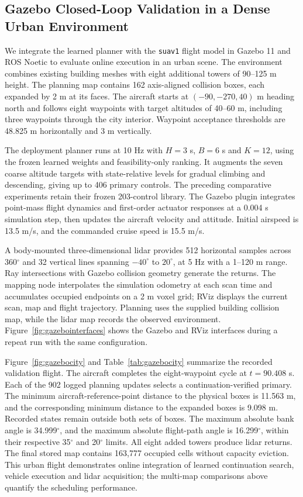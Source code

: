 \subsection{Gazebo Closed-Loop Validation in a Dense Urban Environment}
\label{sec:gazebocity}
We integrate the learned planner with the \texttt{suav1} flight model in Gazebo 11 and ROS Noetic to evaluate online execution in an urban scene. The environment combines existing building meshes with eight additional towers of 90--125 m height. The planning map contains 162 axis-aligned collision boxes, each expanded by 2 m at its faces. The aircraft starts at $(-90,-270,40)$ m heading north and follows eight waypoints with target altitudes of 40--60 m, including three waypoints through the city interior. Waypoint acceptance thresholds are 48.825 m horizontally and 3 m vertically.

The deployment planner runs at 10 Hz with $H=3$ s, $B=6$ s and $K=12$, using the frozen learned weights and feasibility-only ranking. It augments the seven coarse altitude targets with state-relative levels for gradual climbing and descending, giving up to 406 primary controls. The preceding comparative experiments retain their frozen 203-control library. The Gazebo plugin integrates point-mass flight dynamics and first-order actuator responses at a 0.004 s simulation step, then updates the aircraft velocity and attitude. Initial airspeed is 13.5 m/s, and the commanded cruise speed is 15.5 m/s.

A body-mounted three-dimensional lidar provides 512 horizontal samples across 360$^\circ$ and 32 vertical lines spanning $-40^\circ$ to $20^\circ$, at 5 Hz with a 1--120 m range. Ray intersections with Gazebo collision geometry generate the returns. The mapping node interpolates the simulation odometry at each scan time and accumulates occupied endpoints on a 2 m voxel grid; RViz displays the current scan, map and flight trajectory. Planning uses the supplied building collision map, while the lidar map records the observed environment. Figure~\ref{fig:gazebointerfaces} shows the Gazebo and RViz interfaces during a repeat run with the same configuration.

Figure~\ref{fig:gazebocity} and Table~\ref{tab:gazebocity} summarize the recorded validation flight. The aircraft completes the eight-waypoint cycle at $t=90.408$ s. Each of the 902 logged planning updates selects a continuation-verified primary. The minimum aircraft-reference-point distance to the physical boxes is 11.563 m, and the corresponding minimum distance to the expanded boxes is 9.098 m. Recorded states remain outside both sets of boxes. The maximum absolute bank angle is 34.999$^\circ$, and the maximum absolute flight-path angle is 16.299$^\circ$, within their respective 35$^\circ$ and 20$^\circ$ limits. All eight added towers produce lidar returns. The final stored map contains 163,777 occupied cells without capacity eviction. This urban flight demonstrates online integration of learned continuation search, vehicle execution and lidar acquisition; the multi-map comparisons above quantify the scheduling performance.

